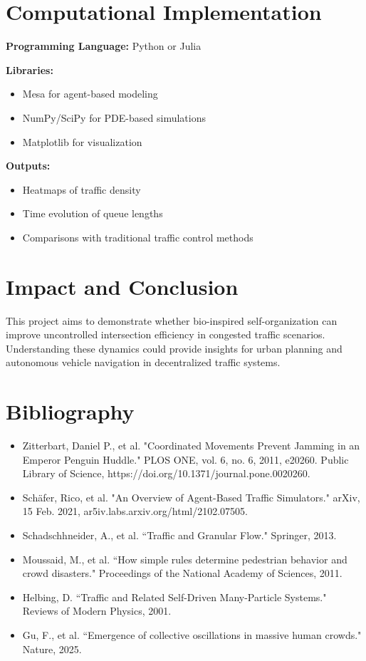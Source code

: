 \documentclass[10pt]{article}
\begin{document}
\section*{Computational Implementation}
\textbf{Programming Language:} Python or Julia 

\vspace{0.25cm}
\textbf{Libraries:}
\begin{itemize}
    \item Mesa for agent-based modeling
    \item NumPy/SciPy for PDE-based simulations
    \item Matplotlib for visualization
\end{itemize}

\textbf{Outputs:}
\begin{itemize}
    \item Heatmaps of traffic density
    \item Time evolution of queue lengths
    \item Comparisons with traditional traffic control methods
\end{itemize}

\section*{Impact and Conclusion}

This project aims to demonstrate whether bio-inspired self-organization can improve uncontrolled intersection efficiency in congested traffic scenarios. 
Understanding these dynamics could provide insights for urban planning and autonomous vehicle navigation in decentralized traffic systems.

\section*{Bibliography}
\begin{itemize}
    \item Zitterbart, Daniel P., et al. "Coordinated Movements Prevent Jamming in an Emperor Penguin Huddle." PLOS ONE, vol. 6, no. 6, 2011, e20260. \newline Public Library of Science, https://doi.org/10.1371/journal.pone.0020260.
    \item Schäfer, Rico, et al. "An Overview of Agent-Based Traffic Simulators." arXiv, 15 Feb. 2021, \newline ar5iv.labs.arxiv.org/html/2102.07505.
    \item Schadschhneider, A., et al. ``Traffic and Granular Flow." Springer, 2013.
    \item Moussaid, M., et al. ``How simple rules determine pedestrian behavior and crowd disasters." Proceedings of the National Academy of Sciences, 2011.
    \item Helbing, D. ``Traffic and Related Self-Driven Many-Particle Systems." Reviews of Modern Physics, 2001.
    \item Gu, F., et al. ``Emergence of collective oscillations in massive human crowds." Nature, 2025. 
\end{itemize}
\end{document}
